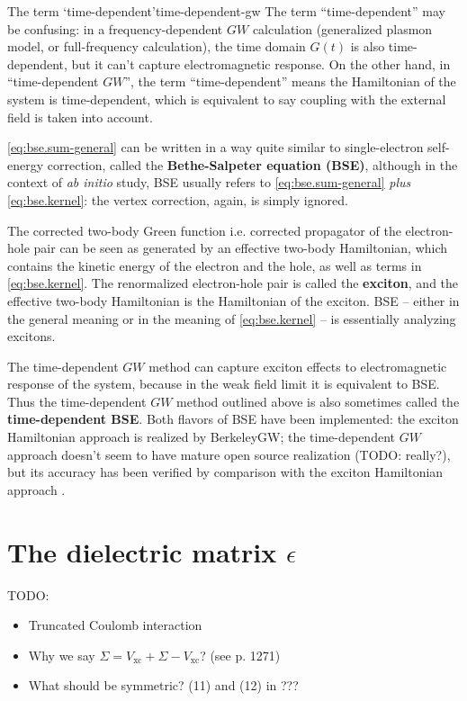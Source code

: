 \documentclass[hyperref, a4paper, 12pt]{report}
\newcommand*{\concept}[1]{{\textbf{#1}}}
\newcommand*{\abinitio}{\textit{ab initio}}
\begin{document}
\begin{infobox}{The term `time-dependent'}{time-dependent-gw}
    The term ``time-dependent'' may be confusing:
    in a frequency-dependent $GW$ calculation 
    (generalized plasmon model, or full-frequency calculation),
    the time domain $G(t)$ is also time-dependent,
    but it can't capture electromagnetic response.
    On the other hand, in ``time-dependent $GW$'',
    the term ``time-dependent''
    means the Hamiltonian of the system is time-dependent,
    which is equivalent to say coupling with the external field 
    is taken into account. 
\end{infobox}

\eqref{eq:bse.sum-general} can be written in a way 
quite similar to single-electron self-energy correction,
called the \concept{Bethe-Salpeter equation (BSE)},
although in the context of \abinitio{} study, 
BSE usually refers to \eqref{eq:bse.sum-general} \emph{plus} \eqref{eq:bse.kernel}:
the vertex correction, again, is simply ignored.

The corrected two-body Green function i.e. corrected propagator of the electron-hole pair 
can be seen as generated by 
an effective two-body Hamiltonian,
which contains the kinetic energy of the electron and the hole,
as well as terms in \eqref{eq:bse.kernel}.
The renormalized electron-hole pair 
is called the \concept{exciton},
and the effective two-body Hamiltonian is the Hamiltonian of the exciton. 
BSE -- either in the general meaning or in the meaning of \eqref{eq:bse.kernel} -- 
is essentially analyzing excitons.

The time-dependent $GW$ method 
can capture exciton effects to electromagnetic response of the system,
because in the weak field limit 
it is equivalent to BSE.
Thus the time-dependent $GW$ method outlined above 
is also sometimes called the \concept{time-dependent BSE}.
Both flavors of BSE have been implemented:
the exciton Hamiltonian approach is realized by BerkeleyGW;
the time-dependent $GW$ approach doesn't seem to have mature open source realization (TODO: really?),
but its accuracy has been verified by comparison with the exciton Hamiltonian approach
\cite{attaccalite2011real}.

\section{The dielectric matrix $\epsilon$}\label{sec:gw-bse.overview-gw.epsilon}

TODO: 
\begin{itemize}
    \item Truncated Coulomb interaction
    \item Why we say $\Sigma = V_{\text{xc}} + \Sigma - V_{\text{xc}}$?
    (see \cite{berkeleygw} p. 1271)
    \item What should be symmetric? (11) and (12) in \cite{berkeleygw}???
\end{itemize}
\end{document}
